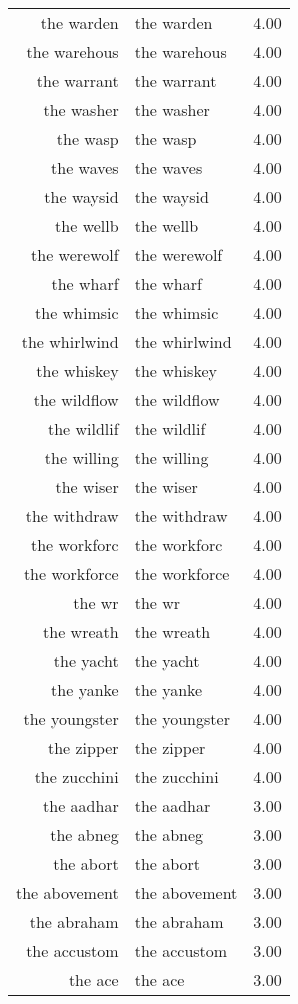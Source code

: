 \begin{table}[ht]
\begin{tabular}{rlr}
  the warden & the warden & 4.00 \\ 
  the warehous & the warehous & 4.00 \\ 
  the warrant & the warrant & 4.00 \\ 
  the washer & the washer & 4.00 \\ 
  the wasp & the wasp & 4.00 \\ 
  the waves & the waves & 4.00 \\ 
  the waysid & the waysid & 4.00 \\ 
  the wellb & the wellb & 4.00 \\ 
  the werewolf & the werewolf & 4.00 \\ 
  the wharf & the wharf & 4.00 \\ 
  the whimsic & the whimsic & 4.00 \\ 
  the whirlwind & the whirlwind & 4.00 \\ 
  the whiskey & the whiskey & 4.00 \\ 
  the wildflow & the wildflow & 4.00 \\ 
  the wildlif & the wildlif & 4.00 \\ 
  the willing & the willing & 4.00 \\ 
  the wiser & the wiser & 4.00 \\ 
  the withdraw & the withdraw & 4.00 \\ 
  the workforc & the workforc & 4.00 \\ 
  the workforce & the workforce & 4.00 \\ 
  the wr & the wr & 4.00 \\ 
  the wreath & the wreath & 4.00 \\ 
  the yacht & the yacht & 4.00 \\ 
  the yanke & the yanke & 4.00 \\ 
  the youngster & the youngster & 4.00 \\ 
  the zipper & the zipper & 4.00 \\ 
  the zucchini & the zucchini & 4.00 \\ 
  the aadhar & the aadhar & 3.00 \\ 
  the abneg & the abneg & 3.00 \\ 
  the abort & the abort & 3.00 \\ 
  the abovement & the abovement & 3.00 \\ 
  the abraham & the abraham & 3.00 \\ 
  the accustom & the accustom & 3.00 \\ 
  the ace & the ace & 3.00 \\ 

\end{tabular}
\end{table}
